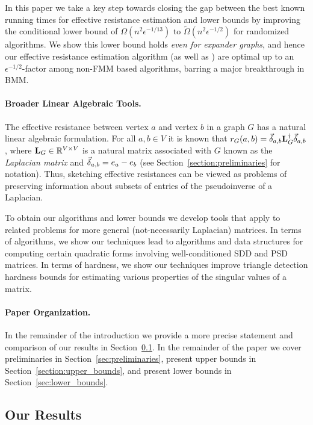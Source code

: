 In this paper we take a key step towards closing the gap between the best known running times for effective resistance estimation and lower bounds by improving the conditional lower bound of $\Omega(n^2\epsilon^{-1/13})$ to $\widetilde{\Omega}(n^2 \epsilon^{-1/2})$ for randomized algorithms. We show this lower bound holds \emph{even for expander graphs}, and hence our effective resistance estimation algorithm (as well as \cite{JS2018}) are optimal up to an $\epsilon^{-1/2}$-factor among non-FMM based algorithms, barring a major breakthrough in BMM.

\paragraph{Broader Linear Algebraic Tools.}
The effective resistance between vertex $a$ and vertex $b$ in a graph $G$ has a natural linear algebraic formulation. For all $a,b \in V$ it is known that $r_G(a,b) = \vec{\delta}_{a,b} \mathbf{L}_{G}^\dagger \vec{\delta}_{a,b}$, where $\mathbf{L}_{G} \in \mathbb{R}^{V \times V}$ is a natural matrix associated with $G$ known as the \emph{Laplacian matrix} and $\vec{\delta}_{a,b} = e_a - e_b$ (see Section~\ref{section:preliminaries} for notation). Thus, sketching effective resistances can be viewed as problems of preserving information about subsets of entries of the pseudoinverse of a Laplacian. 

To obtain our algorithms and lower bounds we develop tools that apply to related problems for more general (not-necessarily Laplacian) matrices. In terms of algorithms, we show our techniques lead to algorithms and data structures for computing certain quadratic forms involving well-conditioned SDD and PSD matrices. In terms of hardness, we show our techniques improve triangle detection hardness bounds for estimating various properties of the singular values of a matrix. 

\paragraph{Paper Organization.} 

In the remainder of the introduction we provide a more precise statement and comparison of our results in Section~\ref{section:intro_results}. 
In the remainder of the paper we cover preliminaries in Section~\ref{sec:preliminaries}, present upper bounds in Section~\ref{section:upper_bounds}, and present lower bounds in Section~\ref{sec:lower_bounds}. 

\subsection{Our Results}\label{section:intro_results}

